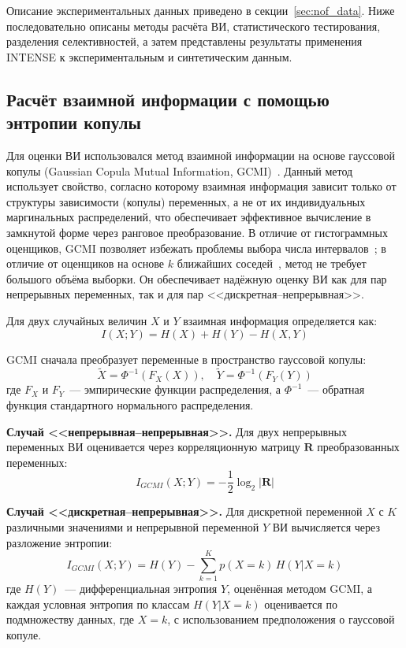 Описание экспериментальных данных приведено в секции~\ref{sec:nof_data}. Ниже последовательно описаны методы расчёта ВИ, статистического тестирования, разделения селективностей, а затем представлены результаты применения INTENSE к экспериментальным и синтетическим данным.


\subsection{Расчёт взаимной информации с помощью энтропии копулы}\label{sec:intense_gcmi}

Для оценки ВИ использовался метод взаимной информации на основе гауссовой копулы (Gaussian Copula Mutual Information, GCMI)~\cite{Ince2017, ma2011mutual}. Данный метод использует свойство, согласно которому взаимная информация зависит только от структуры зависимости (копулы) переменных, а не от их индивидуальных маргинальных распределений, что обеспечивает эффективное вычисление в замкнутой форме через ранговое преобразование. В отличие от гистограммных оценщиков, GCMI позволяет избежать проблемы выбора числа интервалов~\cite{Ross2014}; в отличие от оценщиков на основе $k$ ближайших соседей~\cite{Kraskov2004}, метод не требует большого объёма выборки. Он обеспечивает надёжную оценку ВИ как для пар непрерывных переменных, так и для пар <<дискретная--непрерывная>>.

Для двух случайных величин $X$ и $Y$ взаимная информация определяется как:
\begin{equation*}
I(X;Y) = H(X) + H(Y) - H(X,Y)
\end{equation*}

GCMI сначала преобразует переменные в пространство гауссовой копулы:
\begin{equation*}
\tilde{X} = \Phi^{-1}(F_X(X)), \quad \tilde{Y} = \Phi^{-1}(F_Y(Y))
\end{equation*}
где $F_X$ и $F_Y$~--- эмпирические функции распределения, а $\Phi^{-1}$~--- обратная функция стандартного нормального распределения.

\textbf{Случай <<непрерывная--непрерывная>>.} Для двух непрерывных переменных ВИ оценивается через корреляционную матрицу $\mathbf{R}$ преобразованных переменных:
\begin{equation*}
I_{GCMI}(X;Y) = -\frac{1}{2}\log_2|\mathbf{R}|
\end{equation*}

\textbf{Случай <<дискретная--непрерывная>>.} Для дискретной переменной $X$ с $K$ различными значениями и непрерывной переменной $Y$ ВИ вычисляется через разложение энтропии:
\begin{equation*}
I_{GCMI}(X;Y) = H(Y) - \sum_{k=1}^{K} p(X=k) \, H(Y | X=k)
\end{equation*}
где $H(Y)$~--- дифференциальная энтропия $Y$, оценённая методом GCMI, а каждая условная энтропия по классам $H(Y|X=k)$ оценивается по подмножеству данных, где $X = k$, с использованием предположения о гауссовой копуле.

